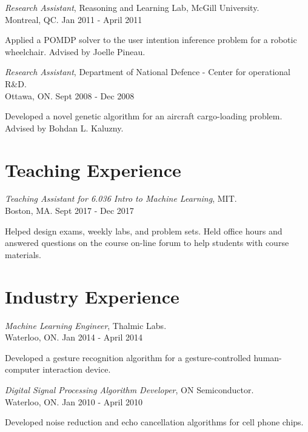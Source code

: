 \documentclass[line,margin,letterpaper]{res}
\begin{document}
\begin{resume}
{\sl Research Assistant}, Reasoning and Learning Lab, McGill University.
\\ \hfill Montreal, QC. Jan 2011 - April 2011
\begin{list}{}
\item Applied a POMDP solver to the user intention inference problem for a robotic wheelchair. Advised by Joelle Pineau.
\end{list}

{\sl Research Assistant}, Department of National Defence - Center for operational R\&D.
\\ \hfill Ottawa, ON. Sept 2008 - Dec 2008
\begin{list}{}
\item Developed a novel genetic algorithm for an aircraft cargo-loading problem.  Advised by Bohdan L. Kaluzny.
\end{list}

\section{Teaching Experience}
{\sl Teaching Assistant for 6.036 Intro to Machine Learning}, MIT.
\\ \hfill Boston, MA. Sept 2017 - Dec 2017
\begin{list}{}
\item  Helped design exams, weekly labs, and problem sets. Held office hours
and answered questions on the course on-line forum to help students with course
materials.
\end{list}

\section{Industry Experience}
{\sl Machine Learning Engineer}, Thalmic Labs.
\\ \hfill Waterloo, ON. Jan 2014 - April 2014
\begin{list}{}
\item  Developed a gesture recognition algorithm for a gesture-controlled human-computer interaction device.
\end{list}

{\sl Digital Signal Processing Algorithm Developer}, ON Semiconductor.
\\ \hfill Waterloo, ON. Jan 2010 - April 2010
\begin{list}{}
\item Developed noise reduction and echo cancellation algorithms for cell phone chips.
\end{list}


\end{resume}
\end{document}
